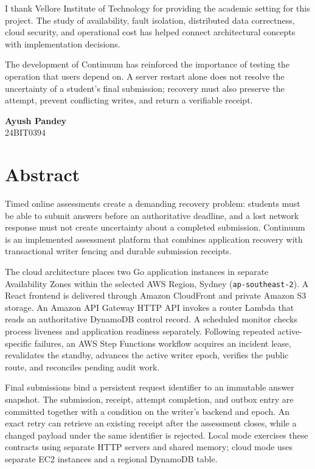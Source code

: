 \documentclass[12pt,a4paper,oneside]{report}
\newcommand{\studentname}{Ayush Pandey}
\newcommand{\registrationnumber}{24BIT0394}
\begin{document}
I thank Vellore Institute of Technology for providing the academic setting for this project. The study of availability, fault isolation, distributed data correctness, cloud security, and operational cost has helped connect architectural concepts with implementation decisions.

The development of Continuum has reinforced the importance of testing the operation that users depend on. A server restart alone does not resolve the uncertainty of a student's final submission; recovery must also preserve the attempt, prevent conflicting writes, and return a verifiable receipt.
\vspace{13mm}\begin{flushright}\textbf{\studentname}\\\registrationnumber\end{flushright}
\chapter*{Abstract}
Timed online assessments create a demanding recovery problem: students must be able to submit answers before an authoritative deadline, and a lost network response must not create uncertainty about a completed submission. Continuum is an implemented assessment platform that combines application recovery with transactional writer fencing and durable submission receipts.

The cloud architecture places two Go application instances in separate Availability Zones within the selected AWS Region, Sydney (\texttt{ap-southeast-2}). A React frontend is delivered through Amazon CloudFront and private Amazon S3 storage. An Amazon API Gateway HTTP API invokes a router Lambda that reads an authoritative DynamoDB control record. A scheduled monitor checks process liveness and application readiness separately. Following repeated active-specific failures, an AWS Step Functions workflow acquires an incident lease, revalidates the standby, advances the active writer epoch, verifies the public route, and reconciles pending audit work.

Final submissions bind a persistent request identifier to an immutable answer snapshot. The submission, receipt, attempt completion, and outbox entry are committed together with a condition on the writer's backend and epoch. An exact retry can retrieve an existing receipt after the assessment closes, while a changed payload under the same identifier is rejected. Local mode exercises these contracts using separate HTTP servers and shared memory; cloud mode uses separate EC2 instances and a regional DynamoDB table.
\end{document}
